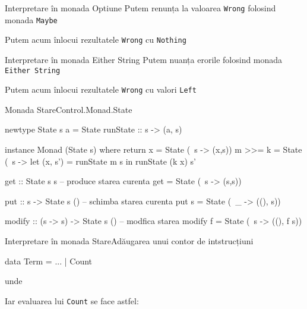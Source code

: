 \documentclass[xcolor=pdftex,romanian,colorlinks]{beamer}
\begin{document}
\begin{frame}[fragile]{Interpretare în monada Optiune}
Putem renunța la valoarea \lstinline$Wrong$ folosind monada \lstinline$Maybe$


Putem acum înlocui rezultatele \lstinline$Wrong$ cu \lstinline$Nothing$

\end{frame}

\begin{frame}[fragile]{Interpretare în monada Either String}
Putem nuanța erorile folosind monada \lstinline$Either String$


Putem acum înlocui rezultatele \lstinline$Wrong$ cu valori \lstinline$Left$

\end{frame}

\begin{frame}[fragile]{Monada Stare}{Control.Monad.State}
\begin{asciihs}
newtype State s a = State { runState :: s -> (a, s) }

instance Monad (State s) where
  return x = State (\ s -> (x,s))
  m >>= k  = State (\ s -> 
    let (x, s') = runState m s
     in runState (k x) s'

get :: State s s                 -- produce starea curenta
get = State (\ s -> (s,s))     

put :: s -> State s ()           -- schimba starea curenta
put s = State (\ _ -> ((), s))

modify :: (s -> s) -> State s () -- modfica starea
modify f = State (\ s -> ((), f s))
\end{asciihs}
\end{frame}

\begin{frame}[fragile]{Interpretare în monada Stare}{Adăugarea unui contor de intstrucțiuni}
\begin{asciihs}
data Term = ... | Count
\end{asciihs}



\vspace{-1ex}
unde


Iar evaluarea lui \lstinline$Count$ se face astfel:

\end{frame}
\end{document}
